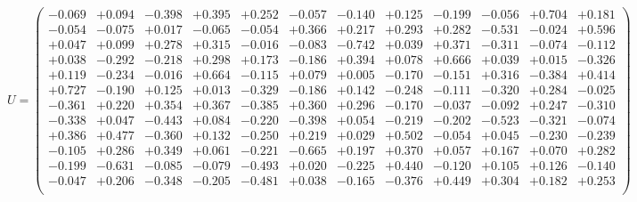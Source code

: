 \documentclass[9pt]{article}
\theoremstyle{plain}
\theoremstyle{definition}
\theoremstyle{remark}
\numberwithin{equation}{section}
\begin{document}
$U = \left(
\begin{array}{
cccccccccccc}
-0.069 & +0.094 & -0.398 & +0.395 & +0.252 & -0.057 & -0.140 & +0.125 & -0.199 & -0.056 & +0.704 & +0.181 \\
-0.054 & -0.075 & +0.017 & -0.065 & -0.054 & +0.366 & +0.217 & +0.293 & +0.282 & -0.531 & -0.024 & +0.596 \\
+0.047 & +0.099 & +0.278 & +0.315 & -0.016 & -0.083 & -0.742 & +0.039 & +0.371 & -0.311 & -0.074 & -0.112 \\
+0.038 & -0.292 & -0.218 & +0.298 & +0.173 & -0.186 & +0.394 & +0.078 & +0.666 & +0.039 & +0.015 & -0.326 \\
+0.119 & -0.234 & -0.016 & +0.664 & -0.115 & +0.079 & +0.005 & -0.170 & -0.151 & +0.316 & -0.384 & +0.414 \\
+0.727 & -0.190 & +0.125 & +0.013 & -0.329 & -0.186 & +0.142 & -0.248 & -0.111 & -0.320 & +0.284 & -0.025 \\
-0.361 & +0.220 & +0.354 & +0.367 & -0.385 & +0.360 & +0.296 & -0.170 & -0.037 & -0.092 & +0.247 & -0.310 \\
-0.338 & +0.047 & -0.443 & +0.084 & -0.220 & -0.398 & +0.054 & -0.219 & -0.202 & -0.523 & -0.321 & -0.074 \\
+0.386 & +0.477 & -0.360 & +0.132 & -0.250 & +0.219 & +0.029 & +0.502 & -0.054 & +0.045 & -0.230 & -0.239 \\
-0.105 & +0.286 & +0.349 & +0.061 & -0.221 & -0.665 & +0.197 & +0.370 & +0.057 & +0.167 & +0.070 & +0.282 \\
-0.199 & -0.631 & -0.085 & -0.079 & -0.493 & +0.020 & -0.225 & +0.440 & -0.120 & +0.105 & +0.126 & -0.140 \\
-0.047 & +0.206 & -0.348 & -0.205 & -0.481 & +0.038 & -0.165 & -0.376 & +0.449 & +0.304 & +0.182 & +0.253 \\
\end{array}
\right)$ \newline 
\end{document}

